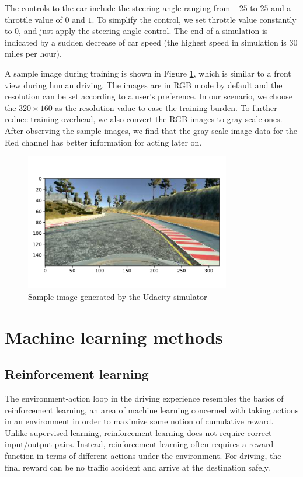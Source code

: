 \documentclass[a4paper]{article}
\begin{document}
The controls to the car include the steering angle ranging from $-25$ to $25$ and a throttle value
of $0$ and $1$. To simplify the control, we set throttle value constantly to $0$, and just apply the
steering angle control. The end of a simulation is indicated by a sudden decrease of car speed (the
highest speed in simulation is 30 miles per hour).

A sample image during training is shown in Figure \ref{fig:sample_rgb}, which is similar to a front 
view during human driving. The images are in RGB mode by default and the resolution can be set according
to a user's preference. In our scenario, we choose the $320 \times 160$ as the resolution value to ease
the training burden. To further reduce training overhead, we 
also convert the RGB images to gray-scale ones. After observing the sample images, we find that
the gray-scale image data for the Red channel has better information for acting later on. 

\begin{figure}
    \centering
    \includegraphics[width=0.8\textwidth]{./figures/sample_rgb.pdf}
    \caption{ Sample image generated by the Udacity simulator }
    \label{fig:sample_rgb}
\end{figure}


\section{Machine learning methods}

\subsection{Reinforcement learning}
The environment-action loop in the driving experience resembles the basics of reinforcement
learning, an area of machine learning concerned with taking actions in an environment in order to
maximize some notion of cumulative reward. Unlike supervised learning, reinforcement learning
does not require correct input/output pairs. Instead, reinforcement learning often requires a
reward function in terms of different actions under the environment. For driving, the final
reward can be no traffic accident and arrive at the destination safely.
\end{document}
